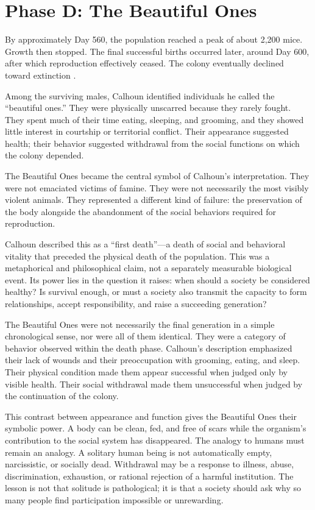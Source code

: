 ﻿\documentclass[12pt,a4paper]{book}
\begin{document}
\section{Phase D: The Beautiful Ones}

By approximately Day 560, the population reached a peak of about 2,200 mice. Growth then stopped. The final successful births occurred later, around Day 600, after which reproduction effectively ceased. The colony eventually declined toward extinction \cite{calhoun1973}.

Among the surviving males, Calhoun identified individuals he called the ``beautiful ones.'' They were physically unscarred because they rarely fought. They spent much of their time eating, sleeping, and grooming, and they showed little interest in courtship or territorial conflict. Their appearance suggested health; their behavior suggested withdrawal from the social functions on which the colony depended.

The Beautiful Ones became the central symbol of Calhoun's interpretation. They were not emaciated victims of famine. They were not necessarily the most visibly violent animals. They represented a different kind of failure: the preservation of the body alongside the abandonment of the social behaviors required for reproduction.

Calhoun described this as a ``first death''---a death of social and behavioral vitality that preceded the physical death of the population. This was a metaphorical and philosophical claim, not a separately measurable biological event. Its power lies in the question it raises: when should a society be considered healthy? Is survival enough, or must a society also transmit the capacity to form relationships, accept responsibility, and raise a succeeding generation?

The Beautiful Ones were not necessarily the final generation in a simple chronological sense, nor were all of them identical. They were a category of behavior observed within the death phase. Calhoun's description emphasized their lack of wounds and their preoccupation with grooming, eating, and sleep. Their physical condition made them appear successful when judged only by visible health. Their social withdrawal made them unsuccessful when judged by the continuation of the colony.

This contrast between appearance and function gives the Beautiful Ones their symbolic power. A body can be clean, fed, and free of scars while the organism's contribution to the social system has disappeared. The analogy to humans must remain an analogy. A solitary human being is not automatically empty, narcissistic, or socially dead. Withdrawal may be a response to illness, abuse, discrimination, exhaustion, or rational rejection of a harmful institution. The lesson is not that solitude is pathological; it is that a society should ask why so many people find participation impossible or unrewarding.
\end{document}
